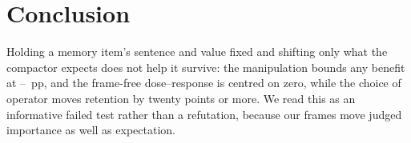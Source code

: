 \section{Conclusion}

Holding a memory item's sentence and value fixed and shifting only what the compactor expects does not
help it survive: the manipulation bounds any benefit at \ConeUpper{}--\ConeUpperWorst{}~pp, and the
frame-free dose--response is centred on zero, while the choice of operator moves retention by twenty
points or more. We read this as an informative failed test rather than a refutation, because our
frames move judged importance as well as expectation.
